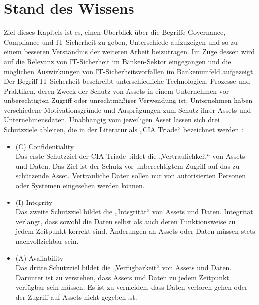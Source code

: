 \setlength{\parindent}{0em} 

\chapter{Stand des Wissens}
\label{cha:stand_des_wissens_stand_der_technik}
Ziel dieses Kapitels ist es, einen Überblick über die Begriffe \glqq{}Governance\grqq{}, \glqq{}Compliance\grqq{} und \glqq{}IT-Sicherheit\grqq{} zu geben, Unterschiede aufzuzeigen und so zu einem besseren Verständnis der weiteren Arbeit beizutragen. Im Zuge dessen wird auf die Relevanz von IT-Sicherheit im Banken-Sektor eingegangen und die möglichen Auswirkungen von IT-Sicherheitsvorfällen im Bankenumfeld aufgezeigt. 
\bigbreak
Der Begriff IT-Sicherheit beschreibt unterschiedliche Technologien, Prozesse und Praktiken, deren Zweck der Schutz von Assets in einem Unternehmen vor unberechtigten Zugriff oder unrechtmäßiger Verwendung ist. Unternehmen haben verschiedene Motivationsgründe und Ausprägungen zum Schutz ihrer Assets und Unternehmensdaten. Unabhängig vom jeweiligen Asset lassen sich drei Schutzziele ableiten, die in der Literatur als „CIA Triade“ bezeichnet werden  \autocite{DuttaNitul2021CS}:
\begin{itemize}
    \item (C) Confidentiality\\
    Das erste Schutzziel der CIA-Triade bildet die „Vertraulichkeit“ von Assets und Daten. Das Ziel ist der Schutz vor unberechtigtem Zugriff auf das zu schützende Asset. Vertrauliche Daten sollen nur von autorisierten Personen oder Systemen eingesehen werden können. 
    \item (I) Integrity\\
    Das zweite Schutzziel bildet die „Integrität“ von Assets und Daten. Integrität verlangt, dass sowohl die Daten selbst als auch deren Funktionsweise zu jedem Zeitpunkt korrekt sind. Änderungen an Assets oder Daten müssen stets nachvollziehbar sein. 
    \item (A) Availability\\
    Das dritte Schutzziel bildet die „Verfügbarkeit“ von Assets und Daten. Darunter ist zu verstehen, dass Assets und Daten zu jedem Zeitpunkt verfügbar sein müssen. Es ist zu vermeiden, dass Daten verloren gehen oder der Zugriff auf Assets nicht gegeben ist. 
\end{itemize}
